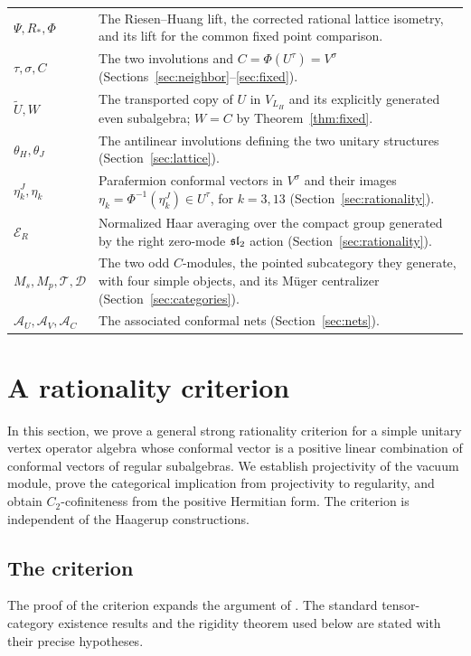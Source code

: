 \documentclass[11pt,reqno]{amsart}
\theoremstyle{definition}\newtheorem{definition}[theorem]{Definition}
\theoremstyle{remark}\newtheorem{remark}[theorem]{Remark}
\newcommand{\Tc}{\mathcal T}\newcommand{\D}{\mathcal D}
\numberwithin{equation}{section}
\begin{document}
\begin{longtable}{@{}p{}p{}@{}}
$\Psi,R_*,\Phi$ & The Riesen--Huang lift, the corrected rational lattice isometry, and its lift for the common fixed point comparison.\\
$\tau,\sigma,C$ & The two involutions and $C=\Phi(U^\tau)=V^\sigma$ (Sections~\ref{sec:neighbor}--\ref{sec:fixed}).\\
$\widetilde U,W$ & The transported copy of $U$ in $V_{L_H}$ and its explicitly generated even subalgebra; $W=C$ by Theorem~\ref{thm:fixed}.\\
$\theta_H,\theta_J$ & The antilinear involutions defining the two unitary structures (Section~\ref{sec:lattice}).\\
$\eta_k^J,\eta_k$ & Parafermion conformal vectors in $V^\sigma$ and their images $\eta_k=\Phi^{-1}(\eta_k^J)\in U^\tau$, for $k=3,13$ (Section~\ref{sec:rationality}).\\
$\mathcal E_R$ & Normalized Haar averaging over the compact group generated by the right zero-mode $\mathfrak{sl}_2$ action (Section~\ref{sec:rationality}).\\
{$M_s,M_p,\Tc,\D$} & {The two odd $C$-modules, the pointed subcategory they generate, with four simple objects, and its M\"uger centralizer (Section~\ref{sec:categories}).}\\
$\mathcal A_U,\mathcal A_V,\mathcal A_C$ & The associated conformal nets (Section~\ref{sec:nets}).\\
\end{longtable}
\endgroup

\section{A rationality criterion}\label{sec:criterion}
In this section, we prove a general strong rationality criterion for a simple unitary vertex operator algebra whose conformal vector is a positive linear combination of conformal vectors of regular subalgebras. We establish projectivity of the vacuum module, prove the categorical implication from projectivity to regularity, and obtain $C_2$-cofiniteness from the positive Hermitian form. The criterion is independent of the Haagerup constructions.

\subsection{The criterion}
The proof of the criterion expands the argument of \cite[Section 4, Proposition 3]{Huang}. The standard tensor-category existence results and the rigidity theorem used below are stated with their precise hypotheses.
\end{document}
